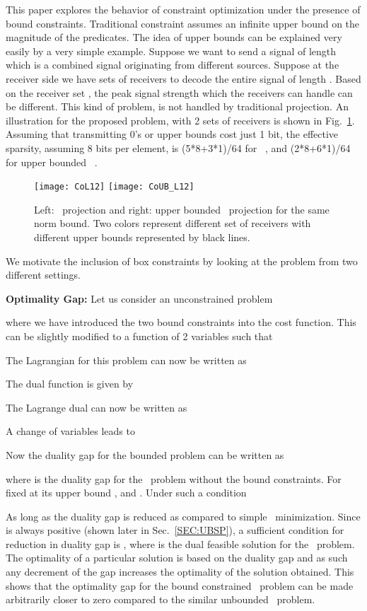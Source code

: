 \documentclass{article}
\def\Lo{~}
\begin{document}
This paper explores the behavior of  constraint optimization under the presence of bound constraints. Traditional  constraint assumes an infinite upper bound on the magnitude of the predicates.
The idea of upper bounds can be explained very easily by a very simple example. Suppose we want to send a signal of length  which is a combined signal originating from  different sources. Suppose at the receiver side we have  sets of receivers to decode the entire signal of length . Based on the receiver set , the peak signal strength which the receivers can handle can be different. This kind of problem, is not handled by traditional  projection. An illustration for the proposed problem, with 2 sets of receivers is shown in Fig.~\ref{Fig:algo1_expl3434345}. Assuming that transmitting 0's or upper bounds cost just 1 bit, the effective sparsity, assuming 8 bits per element, is (5*8+3*1)/64 for \Lo, and (2*8+6*1)/64 for upper bounded \Lo.
\begin{figure}[htbp!]
\texttt{[image: CoL12]}
  \texttt{[image: CoUB\_L12]}
  \caption{Left: \Lo projection and right: upper bounded \Lo projection for the same norm bound. Two colors represent different set of receivers with different upper bounds represented by black lines. \label{Fig:algo1_expl3434345}
}
\end{figure} 
We motivate the inclusion of box constraints by looking at the problem from two different settings.

\textbf{Optimality Gap: } Let us consider an unconstrained problem

where we have introduced the two bound constraints  into the cost function. This can be slightly modified to a function of 2 variables such that

The Lagrangian for this problem can now be written as 

The dual function is given by

The Lagrange dual can now be written as

A change of variables  leads to


Now the duality gap for the bounded problem can be written as

where  is the duality gap for the \Lo problem without the bound constraints. For  fixed at its upper bound ,  and . Under such a condition

As long as  the duality gap is reduced as compared to simple \Lo minimization. Since  is always positive (shown later in Sec.~\ref{SEC:UBSP}), a sufficient condition for reduction in duality gap is , where  is the dual feasible solution for the \Lo problem. The optimality of a particular solution is based on the duality gap and as such any decrement of the gap increases the optimality of the solution obtained. This shows that the optimality gap for the bound constrained \Lo problem can be made arbitrarily closer to zero compared to the similar unbounded \Lo problem.
\end{document}
